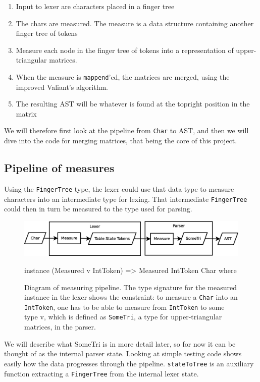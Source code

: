 \documentclass[a4paper,12pt,twosided]{report}
\begin{document}
\begin{enumerate}
    \item Input to lexer are characters placed in a finger tree
    \item The chars are measured. The measure is a data structure containing
          another finger tree of tokens
    \item Measure each node in the finger tree of tokens into a representation
          of upper-triangular matrices.
    \item When the measure is \texttt{mappend}'ed, the matrices are merged,
          using the improved Valiant's algorithm.
    \item The resulting AST will be whatever is found at the topright position
          in the matrix
\end{enumerate}
We will therefore first look at the pipeline from \texttt{Char} to AST, and then
we will dive into the code for merging matrices, that being the core of this
project. 

\subsection{Pipeline of measures}
\label{pipeline}
Using the \texttt{FingerTree} type, the lexer could use that data type to
measure characters into an intermediate type for lexing. That intermediate
\texttt{FingerTree} could then in turn be measured to the type used for parsing.

\begin{figure}[H]
\includegraphics[width=\textwidth]{pipeline.eps}
\begin{code}
instance (Measured v IntToken) => Measured IntToken Char where
\end{code}
\caption{\label{pipelinedia}Diagram of measuring pipeline. The type signature
for the measured instance in the lexer shows the constraint: to measure a
\texttt{Char} into an \texttt{IntToken}, one has to be able to measure from
\texttt{IntToken} to some type v, which is defined as \texttt{SomeTri}, a type
for upper-triangular matrices, in the parser.}
\end{figure}

We will describe what SomeTri is in more detail later, so for now it can be
thought of as the internal parser state. Looking at simple testing
code shows easily how the data progresses through the pipeline.
\texttt{stateToTree} is an auxiliary function extracting a \texttt{FingerTree}
from the internal lexer state.
\end{document}
